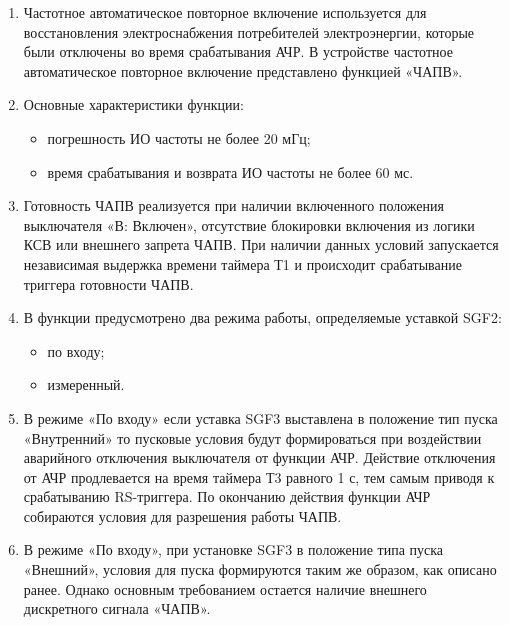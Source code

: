 
\color{black}

\begin{enumerate}

\item
Частотное автоматическое повторное включение используется для восстановления электроснабжения потребителей электроэнергии, которые были отключены во время срабатывания АЧР. В устройстве частотное автоматическое повторное включение представлено функцией «ЧАПВ».

\item
Основные характеристики функции:
\begin{itemize}
    \item погрешность ИО частоты не более 20 мГц;
    \item время срабатывания и возврата ИО частоты не более 60 мс.
\end{itemize}

\item
Готовность ЧАПВ реализуется при наличии включенного положения выключателя «В: Включен», отсутствие блокировки включения из логики КСВ или внешнего запрета ЧАПВ. При наличии данных условий запускается независимая выдержка времени таймера Т1 и происходит срабатывание триггера готовности ЧАПВ.

\item
В функции предусмотрено два режима работы, определяемые уставкой SGF2:
\begin{itemize}
    \item по входу;
    \item измеренный.
\end{itemize}

\item
В режиме «По входу» если уставка SGF3 выставлена в положение тип пуска «Внутренний» то пусковые условия будут формироваться при воздействии аварийного отключения выключателя от функции АЧР. Действие отключения от АЧР продлевается на время таймера Т3 равного 1 с, тем самым приводя к срабатыванию RS-триггера. По окончанию действия функции АЧР собираются условия для разрешения работы ЧАПВ.

\item
В режиме «По входу», при установке SGF3 в положение типа пуска «Внешний», условия для пуска формируются таким же образом, как описано ранее. Однако основным требованием остается наличие внешнего дискретного сигнала «ЧАПВ».


\end{enumerate}
